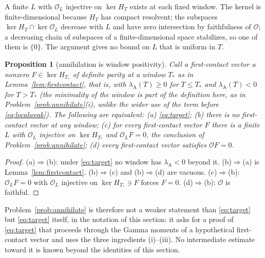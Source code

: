 \documentclass[11pt]{amsart}
\newtheorem{proposition}[theorem]{Proposition}
\theoremstyle{definition}
\theoremstyle{remark}
\begin{document}
A finite $L$ with $\mathcal O_L$ injective on $\ker H_T$ exists at each fixed window. The kernel is
finite-dimensional because $H_T$ has compact resolvent; the subspaces $\ker H_T\cap\ker \mathcal O_L$ decrease
with $L$ and have zero intersection by faithfulness of $\mathcal O$; a decreasing chain of subspaces of a
finite-dimensional space stabilizes, so one of them is $\{0\}$. The argument gives no bound on $L$
that is uniform in $T$.

\begin{proposition}[annihilation is window positivity]\label{prop:annihilate-equiv}
Call a \emph{first-contact vector} a nonzero $F\in\ker H_{T_*}$ of definite parity at a window $T_*$ as in
Lemma~\ref{lem:firstcontact}, that is, with $\lambda_{\mathrm A}(T)\ge0$ for $T\le T_*$ and $\lambda_{\mathrm A}(T)<0$ for
$T>T_*$ (the minimality of the window is part of the definition here, as in Problem~\ref{prob:annihilate}(i), unlike the
wider use of the term before \eqref{eq:localweak}). The following are equivalent:
\emph{(a)} \eqref{eq:target};
\emph{(b)} there is no first-contact vector at any window;
\emph{(c)} for every first-contact vector $F$ there is a finite $L$ with $\mathcal O_L$ injective on $\ker H_{T_*}$ and
$\mathcal O_LF=0$, the conclusion of Problem~\ref{prob:annihilate};
\emph{(d)} every first-contact vector satisfies $\mathcal OF=0$.
\end{proposition}
\begin{proof}
(a)$\Rightarrow$(b): under \eqref{eq:target} no window has $\lambda_{\mathrm A}<0$ beyond it. (b)$\Rightarrow$(a) is
Lemma~\ref{lem:firstcontact}. (b)$\Rightarrow$(c) and (b)$\Rightarrow$(d) are vacuous. (c)$\Rightarrow$(b): $\mathcal O_LF=0$
with $\mathcal O_L$ injective on $\ker H_{T_*}\ni F$ forces $F=0$. (d)$\Rightarrow$(b): $\mathcal O$ is faithful.
\end{proof}
Problem~\ref{prob:annihilate} is therefore not a weaker statement than \eqref{eq:target} but \eqref{eq:target} itself,
in the notation of this section: it asks for a proof of \eqref{eq:target} that proceeds through the Gamma moments
of a hypothetical first-contact vector and uses the three ingredients (i)--(iii). No intermediate estimate
toward it is known beyond the identities of this section.
\end{document}
